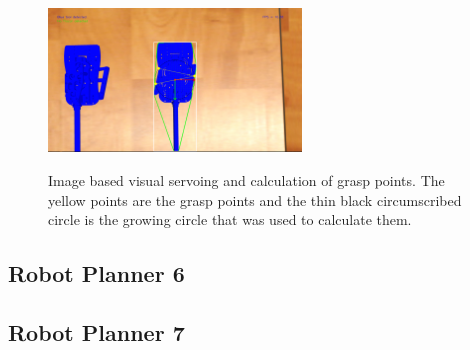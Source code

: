 \begin{center}
\begin{figure}[H]
\centering
\includegraphics[width=0.6\textwidth]{images/grasp-points-triangle.png}\\
\caption{Image based visual servoing and calculation of grasp points. The yellow points are the grasp points and the thin black circumscribed circle is the growing circle that was used to calculate them.}
\end{figure}
\end{center}

\subsection{Robot Planner 6}

\subsection{Robot Planner 7}